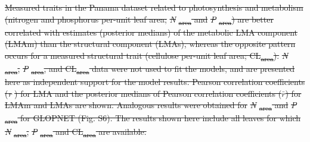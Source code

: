 \documentclass[
  12pt,
  letterpaper,
  DIV=11,
  numbers=noendperiod]{scrartcl}
\providecommand{\DIFdel}[1]{{\protect\color{red}\sout{#1}}}                      %
\providecommand{\DIFdelend}{} %
\providecommand{\DIFdelFL}[1]{\DIFdel{#1}} %
\DeclareRobustCommand{\DIFdelend}{\DIFOaddend \let\includegraphics\DIFOincludegraphics} %
\begin{document}
{%
\DIFdelFL{Measured traits in the Panama dataset related
to photosynthesis and metabolism (nitrogen and phosphorus per-unit leaf
area; }\emph{\DIFdelFL{N}}%
\DIFdelFL{\textsubscript{area} and }\emph{\DIFdelFL{P}}%
\DIFdelFL{\textsubscript{area}) are
better correlated with estimates (posterior medians) of the metabolic
LMA component (LMAm) than the structural component (LMAs), whereas the
opposite pattern occurs for a measured structural trait (cellulose
per-unit leaf area; CL\textsubscript{area}).
}\emph{\DIFdelFL{N}}%
\DIFdelFL{\textsubscript{area}, }\emph{\DIFdelFL{P}}%
\DIFdelFL{\textsubscript{area}, and
CL\textsubscript{area} data were not used to fit the models, and are
presented here as independent support for the model results. Pearson
correlation coefficients (}\emph{\DIFdelFL{r}}%
\DIFdelFL{) for LMA and the posterior medians of
Pearson correlation coefficients (\(\bar{r}\)) for LMAm and LMAs are
shown. Analogous results were obtained for }\emph{\DIFdelFL{N}}%
\DIFdelFL{\textsubscript{area}
and }\emph{\DIFdelFL{P}}%
\DIFdelFL{\textsubscript{area} for GLOPNET (Fig. S6). The results
shown here include all leaves for which }\emph{\DIFdelFL{N}}%
\DIFdelFL{\textsubscript{area},
}\emph{\DIFdelFL{P}}%
\DIFdelFL{\textsubscript{area} and CL\textsubscript{area} are available.}}

\DIFdelend 
\end{document}
